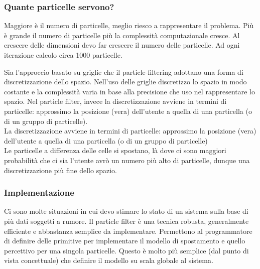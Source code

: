 \subsubsection{Quante particelle servono?}
Maggiore è il numero di particelle, meglio riesco a rappresentare il problema. 
Più è grande il numero di particelle più la complessità computazionale cresce. 
Al crescere delle dimensioni devo far crescere il numero delle particelle. 
Ad ogni iterazione calcolo circa 1000 particelle. 

Sia l'approccio basato su griglie che il particle-filtering adottano una forma di discretizzazione dello spazio.
Nell'uso delle griglie discretizzo lo spazio in modo costante e la complessità varia in base alla precisione che uso nel 
rappresentare lo spazio.
Nel particle filter, invece la discretizzazione avviene in termini di particelle: approssimo la posizione (vera) dell'utente a quella di una particella (o di un gruppo di particelle).
\\ La discretizzazione avviene in termini di particelle: approssimo la posizione (vera) dell’utente a quella di una particella (o 
di un gruppo di particelle)
\\ Le particelle a differenza delle celle si spostano, là dove ci sono maggiori probabilità che ci sia l’utente avrò un numero 
più alto di particelle, dunque una discretizzazione più fine dello spazio.


\subsubsection{Implementazione}
Ci sono molte situazioni in cui devo stimare lo stato di un sistema sulla base di più dati soggetti a rumore. 
Il particle filter è una tecnica robusta, generalmente efficiente e abbastanza semplice da implementare. 
Permettono al programmatore di definire delle primitive per 
implementare il modello di spostamento e quello percettivo per una 
singola particelle. 
Questo è molto più semplice (dal punto di vista concettuale) che 
definire il modello su scala globale al sistema.